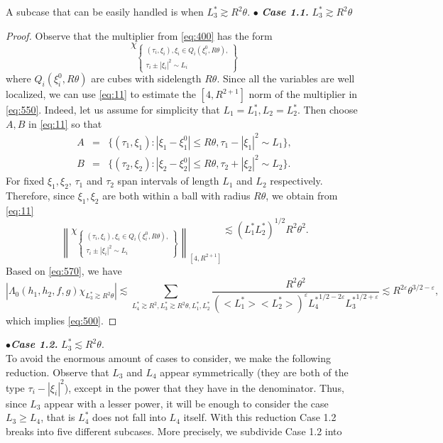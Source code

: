 \documentclass[draft,11pt,leqno]{amsart}
\newcommand{\norm}[2]{{\left\| #1 \right\|}_{#2}}
\newcommand{\ve}{\varepsilon}
\newcommand{\La}{\Lambda}
\newcommand{\suml}{\sum\limits}
\newcommand{\f}{\displaystyle\frac}
\newcommand{\lone}{{L_1^{*}}}
\newcommand{\ltwo}{{L_2^{*}}}
\newcommand{\lthree}{{L_3^{*}}}
\newcommand{\lfour}{{L_4^{*}}}
\begin{document}
A subcase that can be  easily handled is when $\lthree\gtrsim R^2\theta$.
\newline
$\bullet$ {\it\bf Case 1.1.} $\lthree\gtrsim R^2\theta$
\begin{proof}
Observe that the multiplier from \eqref{eq:400} has the form
\begin{equation}
\label{eq:550}
\chi_{\left\{\begin{array}{l}
(\tau_i,\xi_i), \xi_i\in Q_i(\xi_i^0,R\theta), \\
\tau_i\pm |\xi_i|^2\sim L_i \end{array}\right\}}
\end{equation}
where $Q_i(\xi_i^0,R\theta)$ are cubes with sidelength $R\theta$.
Since all the variables are well localized, we can use \eqref{eq:11} to estimate the $[4,R^{2+1}]$
norm of the multiplier in \eqref{eq:550}.
Indeed, let us assume for simplicity that $L_1=\lone, L_2=\ltwo$. Then
choose $A, B$ in \eqref{eq:11} so that
\begin{eqnarray*}
A &=&\{(\tau_1,\xi_1):|\xi_1-\xi_1^0|\leq R\theta, \tau_1-|\xi_1|^2\sim L_1\},\\
B &=&\{(\tau_2,\xi_2):|\xi_2-\xi_2^0|\leq R\theta, \tau_2+|\xi_2|^2\sim L_2\}.
\end{eqnarray*}
For fixed $\xi_1,\xi_2$, $\tau_1$ and $\tau_2$ span intervals of length $L_1$ and $L_2$ respectively.
Therefore, since $\xi_1, \xi_2$ are both within a ball with radius $R\theta$,
we obtain from \eqref{eq:11}
\begin{equation}
\label{eq:570}
\norm{\chi_{\left\{\begin{array}{l}
(\tau_i,\xi_i), \xi_i\in Q_i(\xi_i^0,R\theta), \\
\tau_i\pm |\xi_i|^2\sim L_i \end{array}\right\}}}{[4,R^{2+1}]}\lesssim (\lone\ltwo)^{1/2}R^2\theta^2.
\end{equation}
Based on \eqref{eq:570}, we have
$$
|\La_0(h_1,h_2,f,g)\chi_{\lthree\gtrsim R^2\theta}|\lesssim \suml_{\lfour\gtrsim R^2,\lthree\gtrsim R^2\theta,\lone,\ltwo}
\f{R^2\theta^2}{(<\lone><\ltwo>)^{\ve}\lfour^{1/2-2\ve}\lthree^{1/2+\ve}}\lesssim R^{2\ve}\theta^{3/2-\ve}, 
$$
which implies \eqref{eq:500}.
\end{proof}
$\bullet${\it\bf Case 1.2.} $\lthree\lesssim R^2\theta$. \\
To avoid the enormous amount of cases to consider, we make the following
reduction. Observe that $L_3$ and $L_4$
appear symmetrically (they are both of the type $\tau_i-|\xi_i|^2$), except in the power that they
have in the denominator. Thus, since $L_3$ appear with a lesser power, it will be enough to consider the case
$L_3\geq L_4$, that is $\lfour$ does not fall into $L_4$ itself. With this 
reduction Case 1.2 breaks into five different subcases. More precisely, 
we subdivide Case 1.2 into
\end{document}
